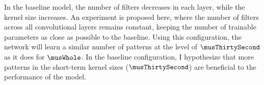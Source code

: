 
In the baseline model, the number of filters decreases in
each layer, while the kernel size increases. An experiment
is proposed here, where the number of filters across all
convolutional layers remains constant, keeping the number of
trainable parameters as close as possible to the baseline.
Using this configuration, the network will learn a similar
number of patterns at the level of $\musThirtySecond$ as it
does for $\musWhole$. In the baseline configuration, I
hypothesize that more patterns in the short-term kernel
sizes ($\musThirtySecond$) are beneficial to the performance of
the model.


